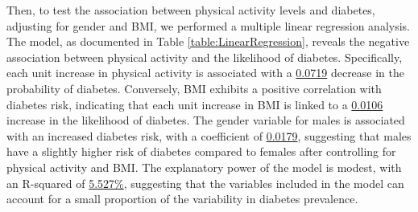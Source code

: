 \documentclass[11pt]{article}
\begin{document}
Then, to test the association between physical activity levels and diabetes, adjusting for gender and BMI, we performed a multiple linear regression analysis. The model, as documented in Table \ref{table:LinearRegression}, reveals the negative association between physical activity and the likelihood of diabetes. Specifically, each unit increase in physical activity is associated with a \hyperlink{B2a}{0.0719} decrease in the probability of diabetes. Conversely, BMI exhibits a positive correlation with diabetes risk, indicating that each unit increase in BMI is linked to a \hyperlink{B3a}{0.0106} increase in the likelihood of diabetes. The gender variable for males is associated with an increased diabetes risk, with a coefficient of \hyperlink{B1a}{0.0179}, suggesting that males have a slightly higher risk of diabetes compared to females after controlling for physical activity and BMI. The explanatory power of the model is modest, with an R-squared of \hyperlink{R1a}{5.527\%}, suggesting that the variables included in the model can account for a small proportion of the variability in diabetes prevalence.
\end{document}
